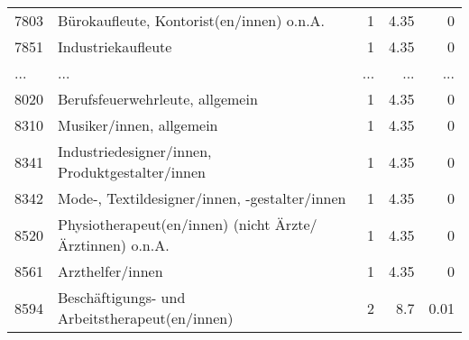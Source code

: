 \begin{longtable}{lXrrr}
        7803 & \multicolumn{1}{X}{Bürokaufleute, Kontorist(en/innen) o.n.A.} & %
          \num{1} &
          \num[round-mode=places,round-precision=2]{4,35} &
          \num[round-mode=places,round-precision=2]{0} \\
        7851 & \multicolumn{1}{X}{Industriekaufleute} & %
          \num{1} &
          \num[round-mode=places,round-precision=2]{4,35} &
          \num[round-mode=places,round-precision=2]{0} \\
       ... & ... & ... & ... & ... \\
        8020 & \multicolumn{1}{X}{Berufsfeuerwehrleute, allgemein} & %
          \num{1} &
          \num[round-mode=places,round-precision=2]{4,35} &
          \num[round-mode=places,round-precision=2]{0} \\

        8310 & \multicolumn{1}{X}{Musiker/innen, allgemein} & %
          \num{1} &
          \num[round-mode=places,round-precision=2]{4,35} &
          \num[round-mode=places,round-precision=2]{0} \\

        8341 & \multicolumn{1}{X}{Industriedesigner/innen, Produktgestalter/innen} & %
          \num{1} &
          \num[round-mode=places,round-precision=2]{4,35} &
          \num[round-mode=places,round-precision=2]{0} \\

        8342 & \multicolumn{1}{X}{Mode-, Textildesigner/innen, -gestalter/innen} & %
          \num{1} &
          \num[round-mode=places,round-precision=2]{4,35} &
          \num[round-mode=places,round-precision=2]{0} \\

        8520 & \multicolumn{1}{X}{Physiotherapeut(en/innen) (nicht Ärzte/Ärztinnen) o.n.A.} & %
          \num{1} &
          \num[round-mode=places,round-precision=2]{4,35} &
          \num[round-mode=places,round-precision=2]{0} \\

        8561 & \multicolumn{1}{X}{Arzthelfer/innen} & %
          \num{1} &
          \num[round-mode=places,round-precision=2]{4,35} &
          \num[round-mode=places,round-precision=2]{0} \\

        8594 & \multicolumn{1}{X}{Beschäftigungs- und Arbeitstherapeut(en/innen)} & %
          \num{2} &
          \num[round-mode=places,round-precision=2]{8,7} &
          \num[round-mode=places,round-precision=2]{0,01} \\


\end{longtable}
